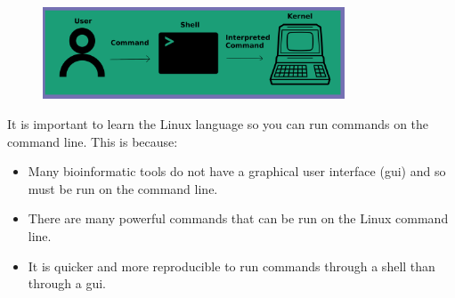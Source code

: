 \documentclass[
  letterpaper,
  DIV=11,
  numbers=noendperiod]{scrreprt}
\providecommand{\tightlist}{%
  \setlength{\itemsep}{0pt}\setlength{\parskip}{0pt}}\usepackage{longtable,booktabs,array}
\begin{document}
\begin{figure}

{\centering \includegraphics[width=0.8\textwidth,height=\textheight]{figures/linux_user_to_kernel.png}

}

\end{figure}

It is important to learn the Linux language so you can run commands on
the command line. This is because:

\begin{itemize}
\tightlist
\item
  Many bioinformatic tools do not have a graphical user interface (gui)
  and so must be run on the command line.
\item
  There are many powerful commands that can be run on the Linux command
  line.
\item
  It is quicker and more reproducible to run commands through a shell
  than through a gui.
\end{itemize}
\end{document}
